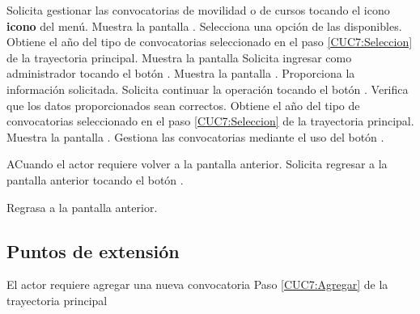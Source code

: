 	\begin{UCtrayectoria}
		\UCpaso[\UCactor] Solicita gestionar las convocatorias de movilidad o de cursos tocando el icono \textbf{icono} del menú.
		\UCpaso [\UCsist] Muestra la pantalla .
		\UCpaso[\UCactor] \label{CUC7:Seleccion} Selecciona una opción de las disponibles.
		\UCpaso [\UCsist] Obtiene el año del tipo de convocatorias seleccionado en el paso \ref{CUC7:Seleccion} de la trayectoria principal.
		\UCpaso [\UCsist] Muestra la pantalla 
		\UCpaso [\UCactor] Solicita ingresar como administrador tocando el botón . 
		\UCpaso [\UCsist] Muestra la pantalla .
		\UCpaso [\UCactor] \label{CUC7:Datos} Proporciona la información solicitada.
		\UCpaso [\UCactor] Solicita continuar la operación tocando el botón . 
		\UCpaso [\UCsist] Verifica que los datos proporcionados sean correctos. 
		\UCpaso [\UCsist] Obtiene el año del tipo de convocatorias seleccionado en el paso \ref{CUC7:Seleccion} de la trayectoria principal.
		\UCpaso [\UCsist] Muestra la pantalla .
		\UCpaso [\UCactor]  \label{CUC7:Agregar} Gestiona las convocatorias mediante el uso del botón .
		
	\end{UCtrayectoria}
	
	\begin{UCtrayectoriaA}{A}{Cuando el actor requiere volver a la pantalla anterior.}
		\UCpaso[\UCactor] Solicita regresar a la pantalla anterior tocando el botón .
		
		\UCpaso [\UCsist] Regrasa a la pantalla anterior.
	\end{UCtrayectoriaA}
	
	\subsection{Puntos de extensión}
	
	\UCExtensionPoint
	{El actor requiere agregar una nueva convocatoria}
	{ Paso \ref{CUC7:Agregar} de la trayectoria principal}
	{}
	
